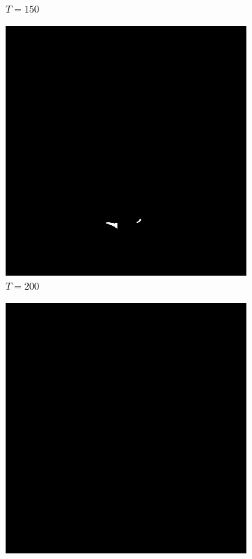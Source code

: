\begin{figure}[H]
\begin{subfigure}[b]{0.3\textwidth}
         \caption{$T = 150$}
         \label{subfig:ThresholdExample2_p4}
     \end{subfigure}
     \hfill
     \begin{subfigure}[b]{0.3\textwidth}
         \centering
         \includegraphics[width=1\textwidth]{8Misc/Pictures/Introduction/img_threshold_p4.jpg}
         \caption{$T = 200$}
         \label{subfig:ThresholdExample2_p5}
     \end{subfigure}
     \hfill
     \begin{subfigure}[b]{0.3\textwidth}
         \centering
         \includegraphics[width=1\textwidth]{8Misc/Pictures/Introduction/img_threshold_p5.jpg}

\end{subfigure}
\end{figure}
